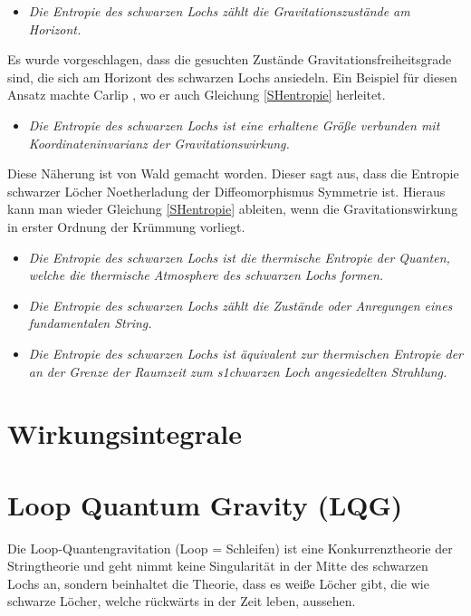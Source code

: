 \documentclass[ngerman]{scrartcl}
\begin{document}
	\begin{itemize}
		\item [~] \textit{Die Entropie des schwarzen Lochs zählt die Gravitationszustände am Horizont.}
	\end{itemize}
	Es wurde vorgeschlagen, dass die gesuchten Zustände Gravitationsfreiheitsgrade sind, die sich am Horizont des schwarzen Lochs ansiedeln. Ein Beispiel für diesen Ansatz machte Carlip \cite{Carlip}, wo er auch Gleichung \eqref{SHentropie} herleitet.
	
	\begin{itemize} 
		\item [~] \textit{Die Entropie des schwarzen Lochs ist eine erhaltene Größe verbunden mit Koordinateninvarianz der Gravitationswirkung.}
	\end{itemize}
	Diese Näherung ist von Wald \cite{Wald} gemacht worden. Dieser sagt aus, dass die Entropie schwarzer Löcher Noetherladung der Diffeomorphismus Symmetrie ist.  Hieraus kann man wieder Gleichung \eqref{SHentropie} ableiten, wenn die Gravitationswirkung in erster Ordnung der Krümmung vorliegt. 
	
	\begin{itemize}
		\item [~] \textit{Die Entropie des schwarzen Lochs ist die thermische Entropie der Quanten, welche die thermische Atmosphere des schwarzen Lochs formen.}
	\end{itemize}
	\cite{ThorneZurek} \cite{Hooft}
	
	\begin{itemize}
		\item [~] \textit{Die Entropie des schwarzen Lochs zählt die Zustände oder Anregungen eines fundamentalen String.}
	\end{itemize}
	\cite{BowickSmolinWijewardhana} \cite{Susskind} \cite{StromingerWafa}
	
	\begin{itemize}
		\item [~] \textit{Die Entropie des schwarzen Lochs ist äquivalent zur thermischen Entropie der an der Grenze der Raumzeit zum s1chwarzen Loch angesiedelten Strahlung.}
	\end{itemize}
	\cite{Witten}
	
\section{Wirkungsintegrale}

\section{Loop Quantum Gravity (LQG)}	
Die Loop-Quantengravitation (Loop = Schleifen) ist eine Konkurrenztheorie der Stringtheorie und geht nimmt keine Singularität in der Mitte des schwarzen Lochs an, sondern beinhaltet die Theorie, dass es weiße Löcher gibt, die wie schwarze Löcher, welche rückwärts in der Zeit leben, aussehen. 
\end{document}
